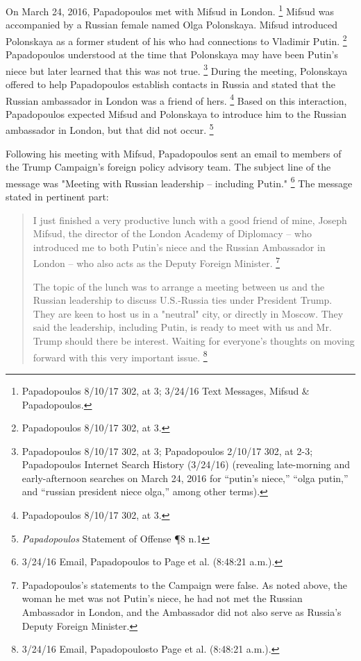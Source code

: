 On March 24, 2016, Papadopoulos met with Mifsud in London.%
\footnote{Papadopoulos 8/10/17 302, at 3; 3/24/16 Text Messages, Mifsud \& Papadopoulos.}
Mifsud was accompanied by a Russian female named Olga Polonskaya.
Mifsud introduced Polonskaya as a former student of his who had connections to Vladimir Putin.%
\footnote{Papadopoulos 8/10/17 302, at 3.}
Papadopoulos understood at the time that Polonskaya may have been Putin's niece but later learned that this was not true.%
\footnote{Papadopoulos 8/10/17 302, at 3;
Papadopoulos 2/10/17 302, at 2-3;
Papadopoulos Internet Search History (3/24/16) (revealing late-morning and early-afternoon searches on March 24, 2016 for “putin’s niece,” “olga putin,” and “russian president niece olga,” among other terms).}
During the meeting, Polonskaya offered to help Papadopoulos establish contacts in Russia and stated that the Russian ambassador in London was a friend of hers.%
\footnote{Papadopoulos 8/10/17 302, at 3.}
Based on this interaction, Papadopoulos expected Mifsud and Polonskaya to introduce him to the Russian ambassador in London, but that did not occur.%
\footnote{\textit{Papadopoulos} Statement of Offense \P 8 n.1}

Following his meeting with Mifsud, Papadopoulos sent an email to members of the Trump Campaign's foreign policy advisory team. The subject line of the message was "Meeting with Russian leadership -- including Putin."%
\footnote{3/24/16 Email, Papadopoulos to Page et al. (8:48:21 a.m.).}
The message stated in pertinent part:

\begin{quote}
I just finished a very productive lunch with a good friend of mine, Joseph Mifsud, the director of the London Academy of Diplomacy -- who introduced me to both Putin's niece and the Russian Ambassador in London -- who also acts as the Deputy Foreign Minister.%
\footnote{Papadopoulos’s statements to the Campaign were false.
As noted above, the woman he met was not Putin’s niece, he had not met the Russian Ambassador in London, and the Ambassador did not also serve as Russia’s Deputy Foreign Minister.}

The topic of the lunch was to arrange a meeting between us and the Russian leadership to discuss U.S.-Russia ties under President Trump.
They are keen to host us in a "neutral" city, or directly in Moscow.
They said the leadership, including Putin, is ready to meet with us and Mr. Trump should there be interest.
Waiting for everyone's thoughts on moving forward with this very important issue.%
\footnote{3/24/16 Email, Papadopoulosto Page et al. (8:48:21 a.m.).}
\end{quote}

